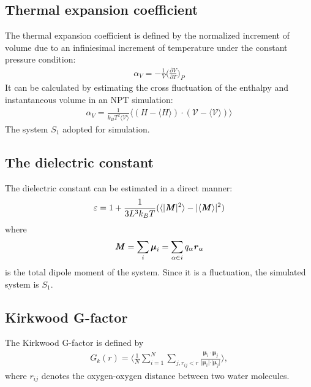 \documentclass[aip,jcp,a4paper,preprint,unsortedaddress,onecolumn,fleqn]{revtex4-1}
\newcommand{\eps}{\varepsilon}
\newcommand{\vect}[1]{\textbf{\textit{#1}}}
\newcommand{\systemsb}{S_1}
\begin{document}
\subsection{Thermal expansion coefficient}
The thermal expansion coefficient is defined by
the normalized increment of volume due to an infiniesimal
increment of temperature under the constant pressure condition:
\begin{align}
  \alpha_V = - \frac 1V \Big(\frac{\partial V}{\partial T}\Big)_P
\end{align}
It can be calculated by estimating the cross fluctuation
of the enthalpy and instantaneous volume  in an NPT simulation:
\begin{align}
  \alpha_V = \frac{1}{k_BT^2\langle \mathcal V\rangle} \langle (H - \langle H\rangle)\cdot(\mathcal V - \langle \mathcal V\rangle) \rangle
\end{align}
The system $\systemsb$ adopted for simulation.


\subsection{The dielectric constant}

The dielectric constant can be estimated in a direct manner:
\begin{align}
  \eps = 1 + \frac{1}{3L^3 k_BT} ( \langle \vert \vect M\vert^2\rangle - \vert\langle \vect M\rangle\vert^2 )
\end{align}
where
\begin{align}
  \vect M = \sum_i\boldsymbol\mu_i = \sum_{\alpha\in i} q_\alpha\vect r_\alpha
\end{align}
is the total dipole moment of the system. Since it is a fluctuation, the simulated system is $\systemsb$.

\subsection{Kirkwood G-factor}

The Kirkwood G-factor is defined by~\cite{vanderSpoel2006origin}
\begin{align}
  G_k(r) =
  \Big\langle
  \frac 1N
  \sum_{i=1}^N \sum_{j, r_{ij} < r}
  \frac {\boldsymbol\mu_i \cdot \boldsymbol\mu_j}{\vert \boldsymbol\mu_i\vert \cdot \vert\boldsymbol\mu_j\vert}
  \Big\rangle,
\end{align}
where $r_{ij}$ denotes the oxygen-oxygen distance between two water
molecules.  
\end{document}

